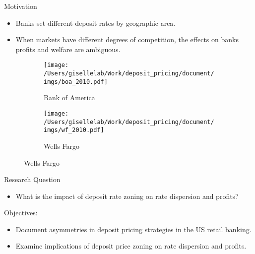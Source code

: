 \documentclass[notes,11pt, aspectratio=169]{beamer}
\begin{document}
  
  
   
  \begin{frame}{Motivation}
    \begin{itemize}
\item Banks set different deposit rates by geographic area. 

\item When markets have different degrees of competition, the effects on banks profits and welfare are ambiguous. 


    
    \end{itemize}

    
    \begin{figure}[t*]
      \begin{subfigure}[t]{0.45\textwidth}
        \label{fig:fig1}
      \texttt{[image: /Users/gisellelab/Work/deposit\_pricing/document/imgs/boa\_2010.pdf]}
      \caption{Bank of America}
      \end{subfigure}\hfill
      \begin{subfigure}[t]{0.45\textwidth}
        \label{fig:fig2}
      \texttt{[image: /Users/gisellelab/Work/deposit\_pricing/document/imgs/wf\_2010.pdf]}
      \caption{Wells Fargo}
      \end{subfigure}
    \end{figure}
    \end{frame}
    
  
\begin{frame}{Research Question}

  

\begin{itemize}
    \item  What is the impact of deposit rate zoning on rate dispersion and profits?
\end{itemize}
\vspace{1cm}
Objectives:
\begin{itemize}
  \item Document asymmetries in deposit pricing strategies in the US retail banking. 
  \item Examine implications of deposit price zoning on rate dispersion and profits.
\end{itemize}

\end{frame}
\end{document}
